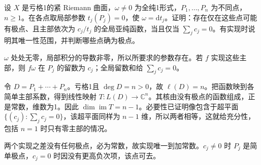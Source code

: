 \begin{exercise}\label{b3:ex:A-2}
设 \(X\) 是亏格1的紧 Riemann 曲面，\(\omega\ne0\) 为全纯1形式，\(P_1,\ldots,P_n\) 为不同点，\(n\ge1\)。在各点取局部参数 \(t_j(P_j)=0\)，使 \(\omega=\mathrm{d}t_j\)。证明：存在仅在这些点可能有极点、且主部依次为 \(c_j/t_j\) 的全局亚纯函数，当且仅当 \(\sum_j c_j=0\)。有实现时说明其唯一性范围，并判断哪些点确为极点。
\end{exercise}
\begin{solution}
\(\omega\) 处处无零，局部积分的导数非零，所以所要求的参数存在。若 \(f\) 实现这些主部，则 \(f\omega\) 在 \(P_j\) 的留数为 \(c_j\)；全局留数和给 \(\sum_j c_j=0\)。

令 \(D=P_1+\cdots+P_n\)。亏格1且 \(\deg D=n>0\)，故 \(\ell(D)=n\)。把函数映到各简单主部系数，得到线性映射 \(T:L(D)\rightarrow\mathbb C^n\)。其核由没有极点的函数组成，正是常数，维数为1。因此 \(\dim\operatorname{im}T=n-1\)。必要性已证明像包含于超平面 \(\{(c_j):\sum_j c_j=0\}\)，该超平面同样为 \(n-1\) 维，所以两者相等，这就给充分性，包括 \(n=1\) 时只有零主部的情况。

两个实现之差没有任何极点，必为常数，故实现唯一到加常数。\(c_j\ne0\) 时 \(P_j\) 是简单极点，\(c_j=0\) 时因没有更高负次项，该点可去。
\end{solution}

